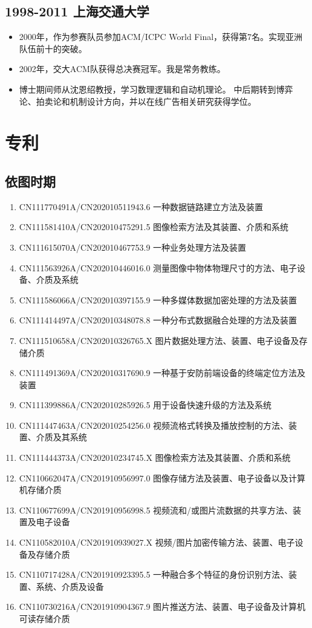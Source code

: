 \documentclass[scheme=plain]{ctexart}
\begin{document}
\subsection*{1998-2011 上海交通大学}

\begin{itemize}
    \item 2000年，作为参赛队员参加ACM/ICPC World Final，获得第7名。实现亚洲队伍前十的突破。
    \item 2002年，交大ACM队获得总决赛冠军。我是常务教练。
    \item 博士期间师从沈恩绍教授，学习数理逻辑和自动机理论。
        中后期转到博弈论、拍卖论和机制设计方向，并以在线广告相关研究获得学位。
\end{itemize}

\appendix
\clearpage
\section{专利}

\subsection*{依图时期}

\begin{enumerate}
    \item CN111770491A/CN202010511943.6 一种数据链路建立方法及装置
    \item CN111581410A/CN202010475291.5 图像检索方法及其装置、介质和系统
    \item CN111615070A/CN202010467753.9 一种业务处理方法及装置
    \item CN111563926A/CN202010446016.0 测量图像中物体物理尺寸的方法、电子设备、介质及系统
    \item CN111586066A/CN202010397155.9 一种多媒体数据加密处理的方法及装置
    \item CN111414497A/CN202010348078.8 一种分布式数据融合处理的方法及装置
    \item CN111510658A/CN202010326765.X 图片数据处理方法、装置、电子设备及存储介质
    \item CN111491369A/CN202010317690.9 一种基于安防前端设备的终端定位方法及装置
    \item CN111399886A/CN202010285926.5 用于设备快速升级的方法及系统
    \item CN111447463A/CN202010254256.0 视频流格式转换及播放控制的方法、装置、介质及其系统
    \item CN111444373A/CN202010234745.X 图像检索方法及其装置、介质和系统
    \item CN110662047A/CN201910956997.0 图像存储方法及装置、电子设备以及计算机存储介质
    \item CN110677699A/CN201910956998.5 视频流和/或图片流数据的共享方法、装置及电子设备
    \item CN110582010A/CN201910939027.X 视频/图片加密传输方法、装置、电子设备及存储介质
    \item CN110717428A/CN201910923395.5 一种融合多个特征的身份识别方法、装置、系统、介质及设备
    \item CN110730216A/CN201910904367.9 图片推送方法、装置、电子设备及计算机可读存储介质
\end{enumerate}
\end{document}

